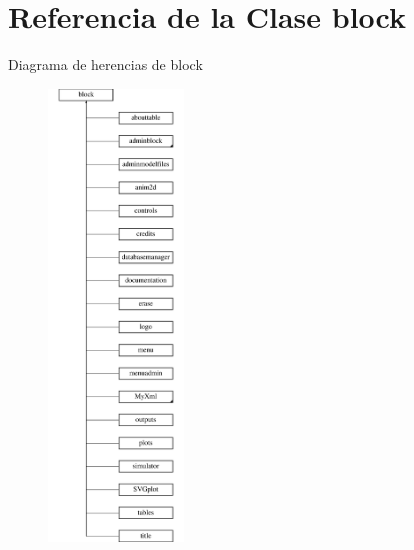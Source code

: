 \hypertarget{classblock}{\section{\-Referencia de la \-Clase block}
\label{classblock}
}
\-Diagrama de herencias de block\begin{figure}[H]
\begin{center}
\leavevmode
\includegraphics[height=12.000000cm]{classblock}
\end{center}
\end{figure}
